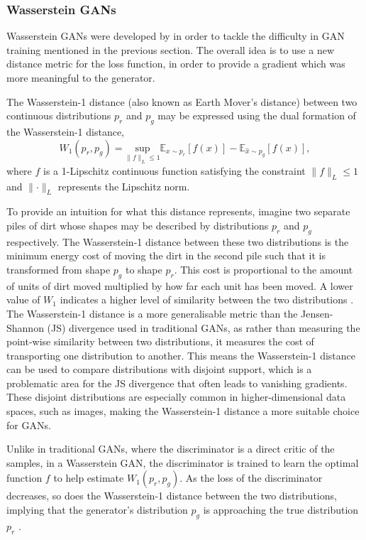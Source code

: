 \documentclass[fleqn,usenatbib]{mnras}
\begin{document}
\subsubsection{Wasserstein GANs}\label{subsubsec:wgan}

Wasserstein GANs were developed by \citet{arjovsky2017wasserstein} in order to tackle the difficulty in GAN training mentioned in the previous section. The overall idea is to 
use a new distance metric for the loss function, in order to provide a gradient which was more meaningful to the generator.

The Wasserstein-1 distance (also known as Earth Mover's distance) \citep{peyre2019computational} between two continuous distributions $p_r$ and $p_g$ may be expressed using the dual formation of the Wasserstein-1 distance,
\begin{equation}\label{eq:Wasserstein_distance}
	W_1(p_r, p_g) = \underset{\lVert f\rVert_L \leq 1}{\text{sup}} \mathbb{E}_{x \sim p_r} [f(x)] - \mathbb{E}_{\hat{x} \sim p_g}[f(x)],
\end{equation}
where $f$ is a 1-Lipschitz continuous function satisfying the constraint $\lVert f\rVert_L \leq 1$ and $\lVert \cdot \rVert_L$ represents the Lipschitz norm.

To provide an intuition for what this distance represents,
imagine two separate piles of dirt whose shapes may be described by distributions $p_r$ and $p_g$ respectively. The Wasserstein-1 distance between these two distributions is 
the minimum energy cost of moving the dirt in the second pile such that it is transformed from shape $p_g$ to shape $p_r$. This cost is proportional to the amount of units of dirt 
moved multiplied by how far each unit has been moved. A lower value of $W_1$ indicates a higher level of similarity between the two distributions \citep{rubner2000earth}. The Wasserstein-1 distance is a more generalisable metric than the Jensen-Shannon (JS) divergence used in traditional GANs, as rather than measuring the point-wise similarity between two distributions, it measures the cost of transporting one distribution to another. This means the Wasserstein-1 distance can be used to compare distributions with disjoint support, which is a problematic area for the JS divergence that often leads to vanishing gradients. These disjoint distributions are especially common in higher-dimensional data spaces, such as images, making the Wasserstein-1 distance a more suitable choice for GANs.

Unlike in traditional GANs, where the discriminator is a direct critic of the samples, in a Wasserstein GAN, the discriminator is trained to learn the optimal function $f$ to help estimate $W_1(p_r, p_{g})$. As the loss of the discriminator decreases, so does the Wasserstein-1 distance between the two distributions, implying that the generator's distribution $p_{g}$ is approaching the true distribution $p_r$ \citep{weng2019gan}.
\end{document}
